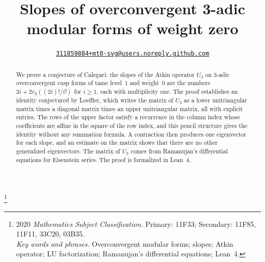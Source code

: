 \documentclass[11pt]{amsart}
\makeatletter
\newcommand{\repo}{https://github.com/mt0-svg/calegari-slopes}
\DeclareRobustCommand{\authorlink}{\href{\repo/issues/new/choose}{\nolinkurl{311859884+mt0-svg@users.noreply.github.com}}}
\theoremstyle{definition}
\numberwithin{equation}{section}
\makeatother
\begin{document}
\title[Slopes of overconvergent 3-adic modular forms]{Slopes of overconvergent 3-adic modular forms of weight zero}
\author{\authorlink}
\thanks{2020 {\em Mathematics Subject Classification.} Primary: 11F33; Secondary: 11F85, 11F11, 33C20, 03B35.\\\indent
{\em Key words and phrases.} Overconvergent modular forms; slopes; Atkin operator; LU factorization; Ramanujan's differential equations; Lean~4.}

\begin{abstract}
We prove a conjecture of Calegari: the slopes of the Atkin operator $U_3$ on $3$-adic overconvergent cusp forms of tame level~$1$ and weight~$0$ are the numbers $2i+2v_3((2i)!/i!)$ for $i\ge1$, each with multiplicity one. The proof establishes an identity conjectured by Loeffler, which writes the matrix of $U_3$ as a lower unitriangular matrix times a diagonal matrix times an upper unitriangular matrix, all with explicit entries. The rows of the upper factor satisfy a recurrence in the column index whose coefficients are affine in the square of the row index, and this pencil structure gives the identity without any summation formula. A contraction then produces one eigenvector for each slope, and an estimate on the matrix shows that there are no other generalized eigenvectors. The matrix of $U_3$ comes from Ramanujan's differential equations for Eisenstein series. The proof is formalized in Lean~4.
\end{abstract}

\maketitle
\end{document}
